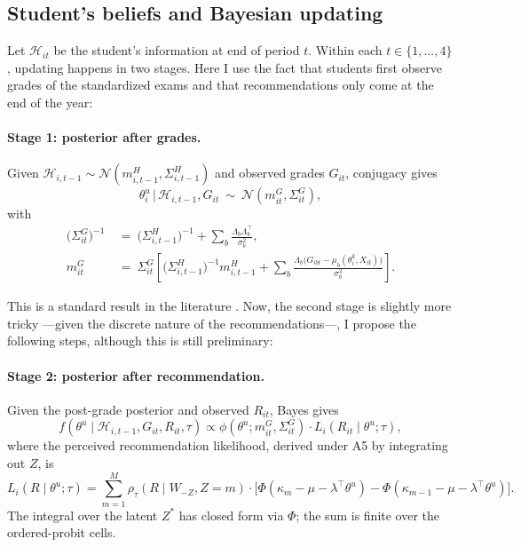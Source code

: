 \documentclass{article}
\begin{document}
\subsection{Student's beliefs and Bayesian updating}
\label{sec:beliefs}

Let $\mathcal{H}_{it}$ be the student's information at end of period $t$. Within each $t \in \{1,\ldots,4\}$, updating happens in two stages. Here I use the fact that students first observe grades of the standardized exams and that recommendations only come at the end of the year:

\paragraph{Stage 1: posterior after grades.} Given $\mathcal{H}_{i,t-1} \sim \mathcal{N}(m^H_{i,t-1}, \Sigma^H_{i,t-1})$ and observed grades $G_{it}$, conjugacy gives
\begin{equation}
  \theta^u_i \,\big|\, \mathcal{H}_{i,t-1}, G_{it} \ \sim\ \mathcal{N}(m^G_{it}, \Sigma^G_{it}),
  \label{eq:post_grade}
\end{equation}
with
\begin{align}
  \big(\Sigma^G_{it}\big)^{-1} &\ =\ \big(\Sigma^H_{i,t-1}\big)^{-1} + \sum_b \frac{\Lambda_b \Lambda_b^\top}{\sigma_b^2}, \label{eq:Sigma_grade}\\
  m^G_{it} &\ =\ \Sigma^G_{it}\!\left[\big(\Sigma^H_{i,t-1}\big)^{-1} m^H_{i,t-1} + \sum_b \frac{\Lambda_b\big(G_{ibt} - \mu_b(\theta^k_i, X_{it})\big)}{\sigma_b^2}\right]. \label{eq:m_grade}
\end{align}

This is a standard result in the literature \citet{arcidiacono2025college, bunting2024heterogeneity}. Now, the second stage is slightly more tricky ---given the discrete nature of the recommendations---, I propose the following steps, although this is still preliminary: 


\paragraph{Stage 2: posterior after recommendation.} Given the post-grade 
posterior and observed $R_{it}$, Bayes gives
\begin{equation}
  f(\theta^u \mid \mathcal{H}_{i,t-1}, G_{it}, R_{it}, \tau)
  \propto \phi(\theta^u; m^G_{it}, \Sigma^G_{it}) \cdot L_i(R_{it} \mid \theta^u; \tau),
  \label{eq:post_rec}
\end{equation}
where the perceived recommendation likelihood, derived under A5 by 
integrating out $Z$, is
\begin{equation}
  L_i(R \mid \theta^u; \tau)
  = \sum_{m=1}^{M} \rho_\tau(R \mid W_{-Z}, Z = m) \cdot 
    \big[\Phi(\kappa_m - \mu - \lambda^\top \theta^u) - 
         \Phi(\kappa_{m-1} - \mu - \lambda^\top \theta^u)\big].
  \label{eq:rec_likelihood}
\end{equation}
The integral over the latent $Z^*$ has closed form via $\Phi$; the sum is 
finite over the ordered-probit cells.
\end{document}
